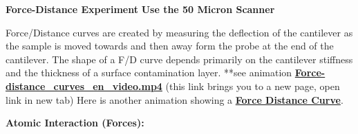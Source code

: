 \documentclass{../lab}
\begin{document}
\textbf{Force-Distance Experiment}
\textbf{Use the 50 Micron Scanner }

Force/Distance curves are created by measuring the deflection of the cantilever as the sample is moved towards and then away form the probe at the end of the cantilever.  The shape of a F/D curve depends primarily on the cantilever stiffness and the thickness of a surface contamination layer.
**see animation \href{http://experimentationlab.berkeley.edu/sites/default/files/AFMImages/Force-distance\_curves\_en\_video.mp4}{\textbf{Force-distance\_curves\_en\_video.mp4}} (this link brings you to a new page, open link in new tab)
Here is another animation showing a \href{http://experimentationlab.berkeley.edu/sites/default/files/AFMImages/6.1\%20Tip\%20Sample.flv\_converted.mp4}{\textbf{Force Distance Curve}}.


\textbf{Atomic Interaction (Forces):}
\end{document}
